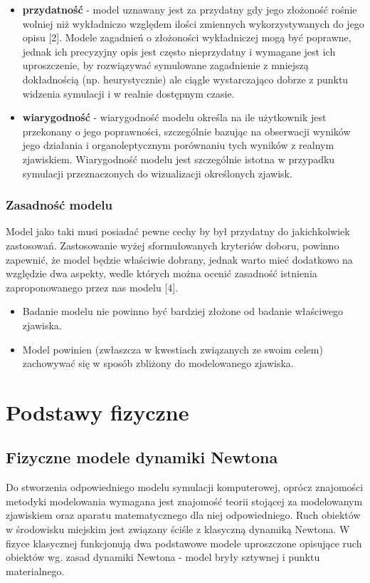 {\begin{itemize}
{\begin{center}
\textit{Popraność modelu względem modelowanego zjawiska [2].}
\end{center}
}
\item \textbf{przydatność} - model uznawany jest za przydatny gdy jego złożoność rośnie wolniej niż wykładniczo względem ilości zmiennych wykorzystywanych do jego opisu [2]. Modele zagadnień o złożoności wykładniczej mogą być poprawne, jednak ich precyzyjny opis jest często nieprzydatny i wymagane jest ich uproszczenie, by rozwiązywać symulowane zagadnienie z mniejszą dokładnością (np. heurystycznie) ale ciągle wystarczająco dobrze z punktu widzenia symulacji i w realnie dostępnym czasie.
\item \textbf{wiarygodność} - wiarygodność modelu określa na ile użytkownik jest przekonany o jego poprawności, szczególnie bazując na obserwacji wyników jego działania i organoleptycznym porównaniu tych wyników z realnym zjawiskiem. Wiarygodność modelu jest szczególnie istotna w przypadku symulacji przeznaczonych do wizualizacji określonych zjawisk.
\end{itemize}
}

\subsubsection{Zasadność modelu}
\par{
Model jako taki musi posiadać pewne cechy by był przydatny do jakichkolwiek zastosowań. Zastosowanie wyżej sformułowanych kryteriów doboru, powinno zapewnić, że model będzie właściwie dobrany, jednak warto mieć dodatkowo na względzie dwa aspekty, wedle których można ocenić zasadność istnienia zaproponowanego przez nas modelu [4].
\begin{itemize}
\item Badanie modelu nie powinno być bardziej złożone od badanie właściwego zjawiska.
\item Model powinien (zwłaszcza w kwestiach związanych ze swoim celem) zachowywać się w sposób zbliżony do modelowanego zjawiska.
\end{itemize}
}


\section[Podstawy fizyczne][Podstawy fizyczne]{Podstawy fizyczne}

\subsection{Fizyczne modele dynamiki Newtona}
\par{
Do stworzenia odpowiedniego modelu symulacji komputerowej, oprócz znajomości metodyki modelowania wymagana jest znajomość teorii stojącej za modelowanym zjawiskiem oraz aparatu matematycznego dla niej odpowiedniego.
Ruch obiektów w środowisku miejskim jest związany ściśle z klasyczną dynamiką Newtona. W fizyce klasycznej funkcjonują dwa podstawowe modele uproszczone opisujące ruch obiektów wg. zasad dynamiki Newtona - model bryły sztywnej i punktu materialnego.
}

